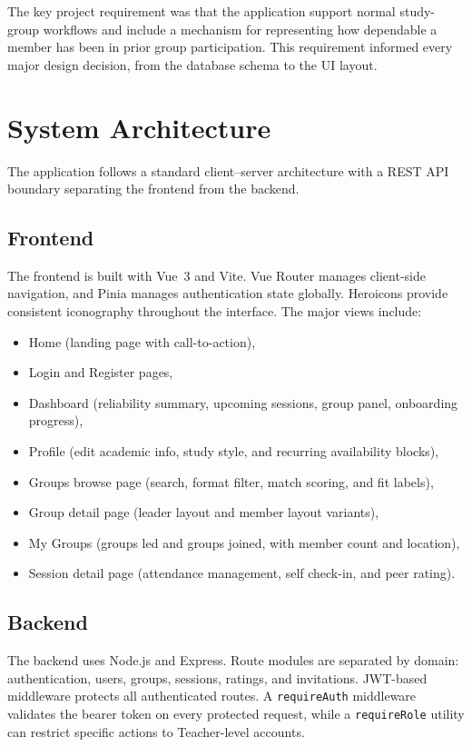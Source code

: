 \documentclass[conference]{IEEEtran}
\begin{document}
The key project requirement was that the application support normal study-group workflows and include a mechanism for representing how dependable a member has been in prior group participation. This requirement informed every major design decision, from the database schema to the UI layout.

\section{System Architecture}
The application follows a standard client--server architecture with a REST API boundary separating the frontend from the backend.

\subsection{Frontend}
The frontend is built with Vue~3 and Vite. Vue Router manages client-side navigation, and Pinia manages authentication state globally. Heroicons provide consistent iconography throughout the interface. The major views include:
\begin{itemize}
    \item Home (landing page with call-to-action),
    \item Login and Register pages,
    \item Dashboard (reliability summary, upcoming sessions, group panel, onboarding progress),
    \item Profile (edit academic info, study style, and recurring availability blocks),
    \item Groups browse page (search, format filter, match scoring, and fit labels),
    \item Group detail page (leader layout and member layout variants),
    \item My Groups (groups led and groups joined, with member count and location),
    \item Session detail page (attendance management, self check-in, and peer rating).
\end{itemize}

\subsection{Backend}
The backend uses Node.js and Express. Route modules are separated by domain: authentication, users, groups, sessions, ratings, and invitations. JWT-based middleware protects all authenticated routes. A \texttt{requireAuth} middleware validates the bearer token on every protected request, while a \texttt{requireRole} utility can restrict specific actions to Teacher-level accounts.
\end{document}
